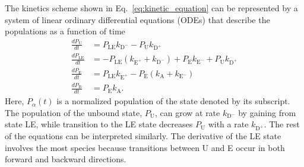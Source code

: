 \documentclass[../talant.diss.submit.tex]{subfiles}
\begin{document}
The kinetics scheme shown in Eq.~\ref{eq:kinetic_equation} can be represented 
by a system of linear ordinary differential equations (ODEs)
that describe the populations as a function of time
%
%
\begin{align}
    \label{eq:SystemODE_1}
  \frac{dP_{\mathrm{U}}}{dt}  &=  P_{\mathrm{LE}}  k_{\mathrm{D}^{-}} - P_{\mathrm{U}}  k_{\mathrm{D}^{+}}\\
      \label{eq:SystemODE_2}
    \frac{dP_{\mathrm{LE}}}{dt} &=- P_{\mathrm{LE}} (k_{\mathrm{E}^{+}} + k_{\mathrm{D}^{-}}) +
                                  P_{\mathrm{E}}  k_{\mathrm{E}^{-}} + P_{\mathrm{U}} k_{\mathrm{D}^{+}} \\
  \label{eq:SystemODE_3}
    \frac{dP_{\mathrm{E}}}{dt}  &=  P_{\mathrm{LE}}  k_{\mathrm{E}^{+}} -
                                  P_{\mathrm{E}} (k_{\mathrm{A}} + k_{\mathrm{E}^{-}}) \\
    \label{eq:SystemODE_4}
    \frac{dP_{\mathrm{B}}}{dt}  &= P_{\mathrm{E}} k_{\mathrm{A}}. 
  \end{align}
%
%
Here, $P_\alpha(t)$ is a normalized population of the state denoted by its subscript.    
The population of the unbound state, $P_{\mathrm{U}}$, can grow at rate $k_{\mathrm{D}^{-}}$ by
gaining from state LE, while transition to the LE state decreases $P_\mathrm{U}$ with
a rate $k_{\mathrm{D}^{+}}$.
The rest of the equations can be interpreted similarly. The derivative of the LE state
involves the most species because transitions between U and E occur in both forward
and backward directions.
\end{document}
